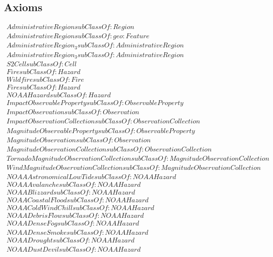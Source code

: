 \subsection{Axioms}
\begin{align}
  AdministrativeRegion subClassOf: Region\\
  AdministrativeRegion subClassOf: geo:Feature\\
  AdministrativeRegion_3 subClassOf: AdministrativeRegion\\
  AdministrativeRegion_3 subClassOf: AdministrativeRegion\\
  S2Cell subClassOf: Cell\\
  Fire subClassOf: Hazard\\
  Wildfire subClassOf: Fire\\
  Fire subClassOf: Hazard\\
  NOAAHazard subClassOf: Hazard\\
  ImpactObservableProperty subClassOf: ObservableProperty\\
  ImpactObservation subClassOf: Observation\\
  ImpactObservationCollection subClassOf: ObservationCollection\\
  MagnitudeObservableProperty subClassOf: ObservableProperty\\
  MagnitudeObservation subClassOf: Observation\\
  MagnitudeObservationCollection subClassOf: ObservationCollection\\
  TornadoMagnitudeObservationCollection subClassOf: MagnitudeObservationCollection\\
  WindMagnitudeObservationCollection subClassOf: MagnitudeObservationCollection\\
  NOAAAstronomicalLowTide subClassOf: NOAAHazard\\
  NOAAAvalanche subClassOf: NOAAHazard\\
  NOAABlizzard subClassOf: NOAAHazard\\
  NOAACoastalFlood subClassOf: NOAAHazard\\
  NOAAColdWindChill subClassOf: NOAAHazard\\
  NOAADebrisFlow subClassOf: NOAAHazard\\
  NOAADenseFog subClassOf: NOAAHazard\\
  NOAADenseSmoke subClassOf: NOAAHazard\\
  NOAADrought subClassOf: NOAAHazard\\
  NOAADustDevil subClassOf: NOAAHazard\\

\end{align}
